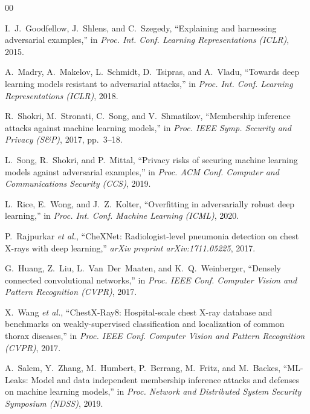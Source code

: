 \documentclass[conference]{IEEEtran}
\begin{document}

\begin{thebibliography}{00}

I.~J.~Goodfellow, J.~Shlens, and C.~Szegedy, ``Explaining and harnessing adversarial examples,'' in \textit{Proc. Int. Conf. Learning Representations (ICLR)}, 2015.

A.~Madry, A.~Makelov, L.~Schmidt, D.~Tsipras, and A.~Vladu, ``Towards deep learning models resistant to adversarial attacks,'' in \textit{Proc. Int. Conf. Learning Representations (ICLR)}, 2018.

R.~Shokri, M.~Stronati, C.~Song, and V.~Shmatikov, ``Membership inference attacks against machine learning models,'' in \textit{Proc. IEEE Symp. Security and Privacy (S\&P)}, 2017, pp.~3--18.

L.~Song, R.~Shokri, and P.~Mittal, ``Privacy risks of securing machine learning models against adversarial examples,'' in \textit{Proc. ACM Conf. Computer and Communications Security (CCS)}, 2019.

L.~Rice, E.~Wong, and J.~Z.~Kolter, ``Overfitting in adversarially robust deep learning,'' in \textit{Proc. Int. Conf. Machine Learning (ICML)}, 2020.

P.~Rajpurkar \textit{et al.}, ``CheXNet: Radiologist-level pneumonia detection on chest X-rays with deep learning,'' \textit{arXiv preprint arXiv:1711.05225}, 2017.

G.~Huang, Z.~Liu, L.~Van~Der~Maaten, and K.~Q.~Weinberger, ``Densely connected convolutional networks,'' in \textit{Proc. IEEE Conf. Computer Vision and Pattern Recognition (CVPR)}, 2017.

X.~Wang \textit{et al.}, ``ChestX-Ray8: Hospital-scale chest X-ray database and benchmarks on weakly-supervised classification and localization of common thorax diseases,'' in \textit{Proc. IEEE Conf. Computer Vision and Pattern Recognition (CVPR)}, 2017.

A.~Salem, Y.~Zhang, M.~Humbert, P.~Berrang, M.~Fritz, and M.~Backes, ``ML-Leaks: Model and data independent membership inference attacks and defenses on machine learning models,'' in \textit{Proc. Network and Distributed System Security Symposium (NDSS)}, 2019.


\end{thebibliography}
\end{document}
